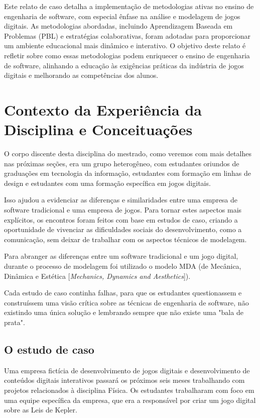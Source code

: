 \documentclass[12pt, onecolumn]{IEEEtran}
\begin{document}
Este relato de caso detalha a implementação de metodologias ativas no ensino de engenharia de software, com especial ênfase na análise e modelagem de jogos digitais. As metodologias abordadas, incluindo Aprendizagem Baseada em Problemas (PBL) e estratégias colaborativas, foram adotadas para proporcionar um ambiente educacional mais dinâmico e interativo. O objetivo deste relato é refletir sobre como essas metodologias podem enriquecer o ensino de engenharia de software, alinhando a educação às exigências práticas da indústria de jogos digitais e melhorando as competências dos alunos.

\section{Contexto da Experiência da Disciplina e Conceituações}

O corpo discente desta disciplina do mestrado, como veremos com mais detalhes nas próximas seções, era um grupo heterogêneo, com estudantes oriundos de graduações em tecnologia da informação, estudantes com formação em linhas de design e estudantes com uma formação específica em jogos digitais.

Isso ajudou a evidenciar as diferenças e similaridades entre uma empresa de software tradicional e uma empresa de jogos. Para tornar estes aspectos mais explícitos, os encontros foram feitos com base em estudos de caso, criando a oportunidade de vivenciar as dificuldades sociais do desenvolvimento, como a comunicação, sem deixar de trabalhar com os aspectos técnicos de modelagem.

Para abranger as diferenças entre um software tradicional e um jogo digital, durante o processo de modelagem foi utilizado o modelo MDA (de Mecânica, Dinâmica e Estética [\textit{Mechanics, Dynamics and Aesthetics}]). 

Cada estudo de caso continha falhas, para que os estudantes questionassem e construíssem uma visão crítica sobre as técnicas de engenharia de {software}, não existindo uma única solução e lembrando sempre que não existe uma "bala de prata"\cite{b11}.

\subsection{O estudo de caso}

Uma empresa fictícia de desenvolvimento de jogos digitais e desenvolvimento de conteúdos digitais interativos
passará os próximos seis meses trabalhando com projetos
relacionados à disciplina Física. Os estudantes trabalharam com foco em uma equipe específica da empresa, que era a responsável por criar um jogo digital sobre as Leis de Kepler.
\end{document}
